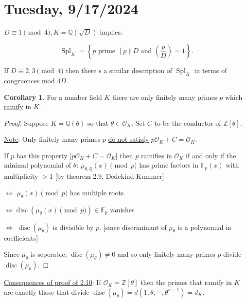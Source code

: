 \documentclass[openany]{amsbook}
\numberwithin{section}{chapter}
\theoremstyle{definition}
\newtheorem{corollary}[theorem]{Corollary}
\begin{document}
\section*{Tuesday, 9/17/2024}

\(D \equiv 1\pmod 4, K = \mathbb{Q} (\sqrt{D})\) implies:

\[
    \operatorname{Spl} _K = \left\{ p \text{ prime } \mid p\nmid D \text{ and } \left( \frac{p}{D} \right) = 1 \right\}.
\]

If \(D \equiv 2, 3 \pmod 4\) then there s a similar description of \(\operatorname{Spl} _K\) in terms of congruences mod \(4D\).

\begin{corollary}
    For a number field \(K\) there are only finitely many primes \(p\) which \underline{ramify} in \(K\).
\end{corollary}

\begin{proof}
    Suppose \(K = \mathbb{Q} (\theta)\) so that \(\theta \in \mathcal{O}_K\). Set \(C\) to be the conductor of \(\mathbb{Z}[\theta]\).

    \underline{Note}: Only finitely many primes \(p\) \underline{do not satisfy} \(p \mathcal{O}_K + C = \mathcal{O}_K\). 

    If \(p\) has this property [\(p \mathcal{O} _K + C = \mathcal{O} _K\)] then \(p\) ramifies in \(\mathcal{O}_K\) if and only if the minimal polynomial of \(\theta \): \(\mu_{\theta , \mathbb{Q}}(x) \pmod p\) has prime factors in \(\mathbb{F} _p(x)\) with multiplicity \(> 1\) [by theorem 2.9, Dedekind-Kummer]
    
    \(\iff\) \(\mu _\theta (x) \pmod p\) has multiple roots

    \(\iff \operatorname{disc}(\mu_\theta (x) \pmod p) \in \mathbb{F}_p\) vanishes

    \(\iff\) \(\operatorname{disc} (\mu_\theta)\) is divisible by \(p\). [since discriminant of \(\mu_\theta\) is a polynomial in coefficients]

    Since \(\mu_\theta\) is seperable, \(\operatorname{disc} (\mu_\theta) \neq 0\) and so only finitely many primes \(p\) divide \(\operatorname{disc} (\mu_\theta)\). 
\end{proof}

\underline{Consequences of proof of 2.10}: If \(\mathcal{O}_K = \mathbb{Z} [\theta]\) then the primes that ramify in \(K\) are exactly those that divide \(\operatorname{disc}(\mu_\theta) = d(1,\theta , \cdots , \theta^{n-1}) = d_K\).
\end{document}
